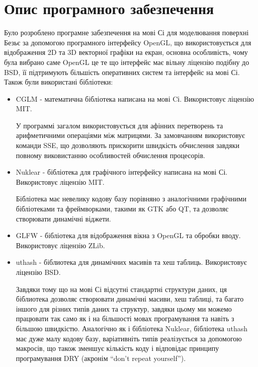 \documentclass[14pt,a4paper]{extarticle}
\theoremstyle{definition}
\renewcommand{\[}{\begin{singlespace}\begin{equation*}}
\renewcommand{\]}{\end{equation*}\end{singlespace}}
\begin{document}
\section{Опис програмного забезпечення}

Було розроблено програмне забезпечення на мові Сі для моделювання поверхні Безьє за допомогою програмного інтерфейсу OpenGL, що використовується для відображення 2D та 3D векторної графіки на екран, основна особливість, чому була вибрано саме OpenGL це те що інтерфейс має вільну ліцензію подібну до BSD, її підтримують більшість оперативних систем та інтерфейс на мові Сі. Також були використані бібліотеки:

\begin{itemize}
\item CGLM - математична бібліотека написана на мові Cі. Використовує ліцензію MIT.

У программі загалом використовується для афінних перетворень та арифметичними операціями між матрицями. За замовчанням використовує команди SSE, що дозволяють прискорити швидкість обчислення завдяки повному виковистанню особливостей обчислення процесорів.

\item Nuklear - бібліотека для графічного інтерфейсу написана на мові Сі. Використовує ліцензію MIT.

Бібліотека має невелику кодову базу порівняно з аналогічними графічними бібліотеками та фреймворками, такими як GTK або QT, та дозволяє створювати динамічні віджети.

\item GLFW - бібліотека для відображення вікна з OpenGL та обробки вводу. Використовує ліцензію ZLib.

\item uthash - біблиотека для динамічних масивів та хеш таблиць. Використовує ліцензію BSD.

Завдяки тому що на мові Сі відсутні стандартні структури даних, ця біблиотека дозволяє створювати динамічні масиви, хеш таблиці, та багато іншого для різних типів даних та структур, завдяки цьому ми можемо працювати так само як і на більшості мовах програмування та навіть з більшою швидкістю. Аналогічно як і бібліотека Nuklear, бібліотека uthash має дуже малу кодову базу, варіативніть типів реалізується за допомогою макросів, що також зменшує кількість коду і відповідає принципу програмування DRY (акронім ``don't repeat yourself'').
\end{itemize}
\end{document}
